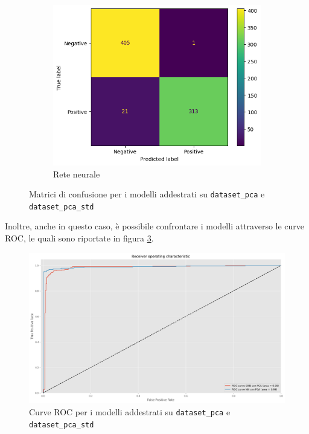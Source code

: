 \begin{figure}[!ht]
\begin{subfigure}{.45\textwidth}
    \end{subfigure}
    \hfill
    \begin{subfigure}{.45\textwidth}
        \centering
        \includegraphics[width=\textwidth]{img/rete/matrice_confusione_PCA.png}
        \caption{Rete neurale}
        \label{fig:matrice_di_confusione_per_NN_pca}
    \end{subfigure}
    \caption{Matrici di confusione per i modelli addestrati su \texttt{dataset\_pca} e \texttt{dataset\_pca\_std}}
    \label{fig:matrice_di_confusione_per_pca}
\end{figure}

Inoltre, anche in questo caso, è possibile confrontare i modelli attraverso le curve
ROC, le quali sono riportate in figura \ref{fig:roc_curve_pca}.
\begin{figure}[!ht]
    \centering
    \includegraphics[width=\textwidth]{img/ris/roc_curve_pca.png}
    \caption{Curve ROC per i modelli addestrati su \texttt{dataset\_pca} e \texttt{dataset\_pca\_std}}
    \label{fig:roc_curve_pca}
\end{figure}

